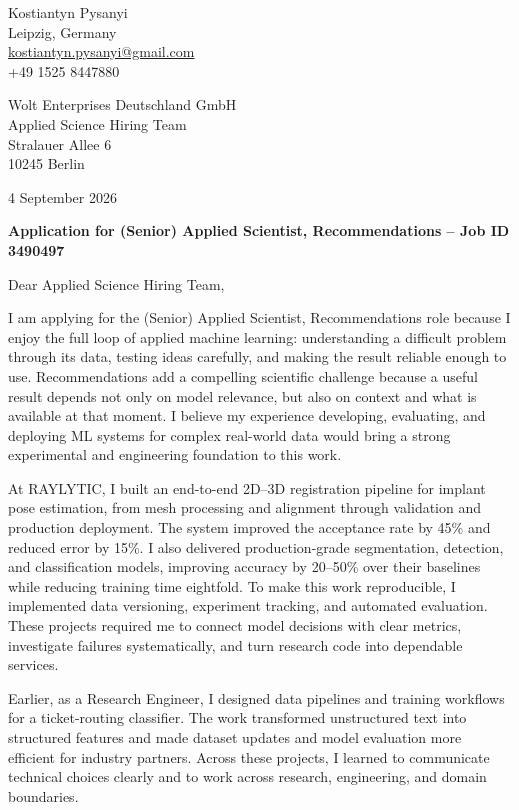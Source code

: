 \documentclass[11pt,a4paper]{article}
\begin{document}
\begin{flushright}
Kostiantyn Pysanyi\\
Leipzig, Germany\\
\href{mailto:kostiantyn.pysanyi@gmail.com}{kostiantyn.pysanyi@gmail.com}\\
+49 1525 8447880
\end{flushright}

Wolt Enterprises Deutschland GmbH\\
Applied Science Hiring Team\\
Stralauer Allee 6\\
10245 Berlin

\begin{flushright}
4 September 2026
\end{flushright}

\textbf{Application for (Senior) Applied Scientist, Recommendations -- Job ID 3490497}

Dear Applied Science Hiring Team,

I am applying for the (Senior) Applied Scientist, Recommendations role because I enjoy the full loop of applied machine learning: understanding a difficult problem through its data, testing ideas carefully, and making the result reliable enough to use. Recommendations add a compelling scientific challenge because a useful result depends not only on model relevance, but also on context and what is available at that moment. I believe my experience developing, evaluating, and deploying ML systems for complex real-world data would bring a strong experimental and engineering foundation to this work.

At RAYLYTIC, I built an end-to-end 2D--3D registration pipeline for implant pose estimation, from mesh processing and alignment through validation and production deployment. The system improved the acceptance rate by 45\% and reduced error by 15\%. I also delivered production-grade segmentation, detection, and classification models, improving accuracy by 20--50\% over their baselines while reducing training time eightfold. To make this work reproducible, I implemented data versioning, experiment tracking, and automated evaluation. These projects required me to connect model decisions with clear metrics, investigate failures systematically, and turn research code into dependable services.

Earlier, as a Research Engineer, I designed data pipelines and training workflows for a ticket-routing classifier. The work transformed unstructured text into structured features and made dataset updates and model evaluation more efficient for industry partners. Across these projects, I learned to communicate technical choices clearly and to work across research, engineering, and domain boundaries.
\end{document}
